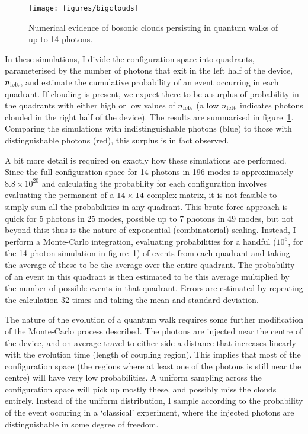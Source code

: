 \begin{figure}[h]
  \centering
  \texttt{[image: figures/bigclouds]}
  \caption[Numerical evidence of bosonic clouds in 14-photon quantum walks]
  {Numerical evidence of bosonic clouds persisting in quantum walks of up to 14
  photons.}
  \label{fig:bigclouds}
\end{figure}
In these simulations, I divide the configuration space into quadrants,
parameterised by the number of photons that exit in the left half of the device,
\(n_{\text{left}}\), and estimate the cumulative probability of an event occurring in
each quadrant. If clouding is present, we expect there to be a surplus of
probability in the quadrants with either high or low values of \(n_{\text{left}}\) (a low
\(n_{\text{left}}\) indicates photons clouded in the right half of the device). The
results are summarised in figure~\ref{fig:bigclouds}. Comparing the simulations
with indistinguishable photons (blue) to those with distinguishable photons
(red), this surplus is in fact observed.

A bit more detail is required on exactly how these simulations are performed. 
Since the full configuration space for 14 photons in 196 modes is approximately
\(8.8 \times 10^{20}\) and calculating the probability for each configuration
involves evaluating the permanent of a \(14 \times 14\) complex matrix, it is not
feasible to simply sum all the probabilities in any quadrant. This brute-force
approach is quick for 5 photons in 25 modes, possible up to 7 photons in 49
modes, but not beyond this: thus is the nature of exponential (combinatorial)
scaling. Instead, I perform a Monte-Carlo integration, evaluating probabilities
for a handful (\(10^{6}\), for the 14 photon simulation in
figure~\ref{fig:bigclouds}) of events from each quadrant and taking the average
of these to be the average over the entire quadrant. The probability of an event
in this quadrant is then estimated to be this average multiplied by the number
of possible events in that quadrant. Errors are estimated by repeating the
calculation 32 times and taking the mean and standard deviation.

The nature of the evolution of a quantum walk requires some further modification
of the Monte-Carlo process described. The photons are injected near the centre
of the device, and on average travel to either side a distance that increases
linearly with the evolution time (length of coupling region). This implies that
most of the configuration space (the regions where at least one of the photons
is still near the centre) will have very low probabilities. A uniform sampling
across the configuration space will pick up mostly these, and possibly miss the
clouds entirely. Instead of the uniform distribution, I sample according to the
probability of the event occuring in a `classical' experiment, where the
injected photons are distinguishable in some degree of freedom.

